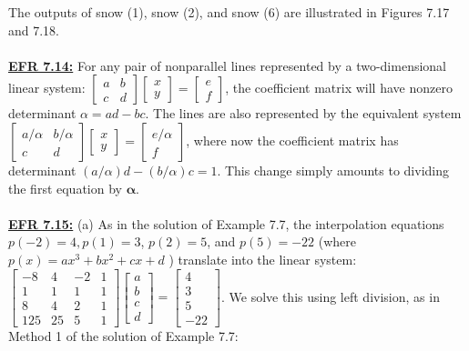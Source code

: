\documentclass[../main.tex]{subfiles}
\begin{document}
The outputs of snow (1), snow (2), and snow (6) are illustrated in Figures 7.17 and 7.18.
\\
\\
\textbf{\underline{EFR 7.14:}} For any pair of nonparallel lines represented by a two-dimensional linear system: $\left[\begin{array}{ll}a & b \\ c & d\end{array}\right]\left[\begin{array}{l}x \\ y\end{array}\right]=\left[\begin{array}{l}e \\ f\end{array}\right]$, the coefficient matrix will have nonzero determinant $\alpha=a d-b c$. The lines are also represented by the equivalent system $\left[\begin{array}{cc}a / \alpha & b / \alpha \\ c & d\end{array}\right]\left[\begin{array}{l}x \\ y\end{array}\right]=\left[\begin{array}{c}e / \alpha \\ f\end{array}\right]$, where now the coefficient matrix has determinant $(a / \alpha) d-(b / \alpha) c=1$. This change simply amounts to dividing the first equation by $\boldsymbol{\alpha}$.
\\
\\
\textbf{\underline{EFR 7.15:}} (a) As in the solution of Example 7.7, the interpolation equations $p(-2)=4, p(1)=3$, $p(2)=5$, and $p(5)=-22$ (where $p(x)=a x^{3}+b x^{2}+c x+d$ ) translate into the linear system: $\left[\begin{array}{cccc}-8 & 4 & -2 & 1 \\ 1 & 1 & 1 & 1 \\ 8 & 4 & 2 & 1 \\ 125 & 25 & 5 & 1\end{array}\right]\left[\begin{array}{l}a \\ b \\ c \\ d\end{array}\right]=\left[\begin{array}{c}4 \\ 3 \\ 5 \\ -22\end{array}\right]$. We solve this using left division, as in Method 1 of the solution of Example 7.7: 
\end{document}

